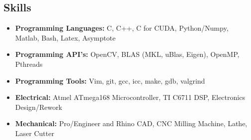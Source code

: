\documentclass[line,lm,rm]{res}
\def\spaceline{\vspace{1mm} \fullline}
\begin{document}
\begin{resume}
\section{Skills}
	\begin{itemize}
	\item 
	\spaceline
{\bf Programming Languages: } C, C++, C for CUDA, Python/Numpy, Matlab, Bash, Latex, Asymptote
\item {\bf Programming API's: } OpenCV, BLAS (MKL, uBlas, Eigen), OpenMP, Pthreads
\item {\bf Programming Tools: } Vim, git, gcc, icc, make, gdb, valgrind
\item {\bf Electrical: } Atmel ATmega168 Microcontroller, TI C6711 DSP, Electronics Design/Rework 
\item {\bf Mechanical: } Pro/Engineer and Rhino CAD, CNC Milling Machine, Lathe, Laser Cutter 
\end{itemize}
		\end{resume}
		
\end{document}
